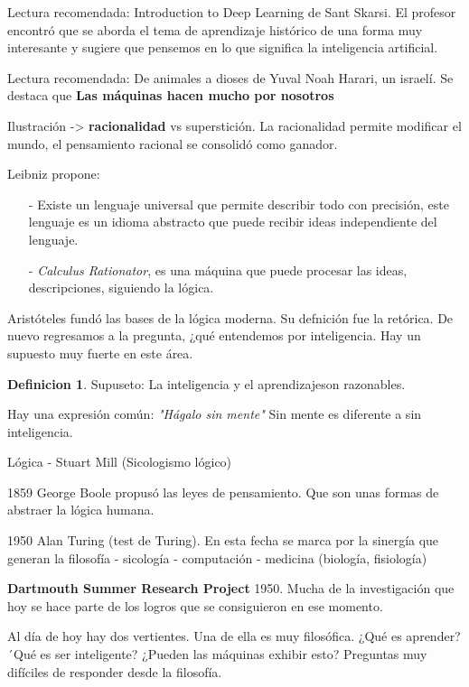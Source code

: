 \documentclass{article}
\theoremstyle{definition}
\newtheorem{definition}{Definicion}
\begin{document}
Lectura recomendada: Introduction to Deep Learning de Sant Skarsi. 
El profesor encontró que se aborda el tema de aprendizaje histórico
de una forma muy interesante y sugiere que pensemos en lo que significa
la inteligencia artificial.

Lectura recomendada: De animales a dioses de Yuval Noah Harari, un 
israelí. Se destaca que \textbf{Las máquinas hacen mucho por nosotros}

Ilustración -> \textbf{racionalidad} vs superstición. La racionalidad 
permite modificar el mundo, el pensamiento racional se consolidó como 
ganador.

Leibniz propone:

\begin{itemize}

  \item[-] Existe un lenguaje universal que permite describir todo con 
    precisión, este lenguaje es un idioma abstracto que puede recibir
    ideas independiente del lenguaje.
  \item[-] \textit{Calculus Rationator}, es una máquina que puede 
    procesar las ideas, descripciones, siguiendo la lógica. 

\end{itemize}

Aristóteles fundó las bases de la lógica moderna. Su defnición fue la 
retórica. De nuevo regresamos a la pregunta, ¿qué entendemos por
inteligencia. Hay un supuesto muy fuerte en este área.

\begin{definition}
Supuseto: La inteligencia y el aprendizajeson razonables.
\end{definition}

Hay una expresión común: \textit{"Hágalo sin mente"}
Sin mente es diferente a sin inteligencia.

Lógica - Stuart Mill (Sicologismo lógico)

1859 George Boole propusó las leyes de pensamiento. Que son unas formas
de abstraer la lógica humana.

1950 Alan Turing (test de Turing). En esta fecha se marca por la sinergía 
que generan la filosofía - sicología - computación - medicina 
(biología, fisiología)

\textbf{Dartmouth Summer Research Project} 1950. Mucha de la investigación
que hoy se hace parte de los logros que se consiguieron en ese momento.

Al día de hoy hay dos vertientes. Una de ella es muy filosófica. 
¿Qué es aprender? ´Qué es ser inteligente? ¿Pueden las máquinas exhibir esto?
Preguntas muy difíciles de responder desde la filosofía.
\end{document}
